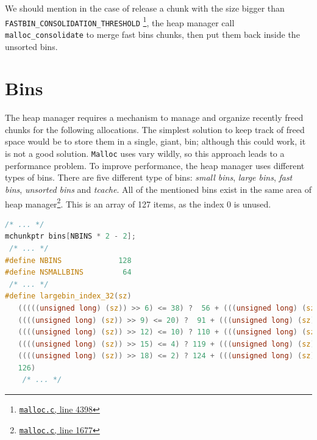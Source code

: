 \documentclass{masterthesis}
\newcommand*\tch{tcache}
\newcommand*\fb{fast bins}
\newcommand*\ub{unsorted bins}
\newcommand*\lb{large bins}
\newcommand*\sbs{small bins}
\newcommand*\Mallocc{\lstinline{Malloc}\xspace}
\begin{document}
We should mention in the case of release a chunk with the size bigger than \linebreak \lstinline{FASTBIN_CONSOLIDATION_THRESHOLD} \footnote{\href{https://sourceware.org/git/?p=glibc.git;a=blob;f=malloc/malloc.c;h=f7cd29bc2f93e1082ee77800bd64a4b2a2897055;hb=9ea3686266dca3f004ba874745a4087a89682617\#l4398}{\texttt{malloc.c}, line 4398}}, the heap manager call \lstinline{malloc_consolidate} to merge \fb{} chunks, then put them back inside the \ub{}.

\section{Bins}
The heap manager requires a mechanism to manage and organize recently freed chunks for the following allocations. The simplest solution to keep track of freed space would be to store them in a single, giant, bin; although this could work, it is not a good solution. \Mallocc{} uses vary wildly, so this approach leads to a performance problem.
To improve performance, the heap manager uses different types of bins. There are five different type of bins: \emph{\sbs{}}, \emph{\lb{}}, \emph{\fb{}}, \emph{\ub{}} and \emph{\tch{}}. All of the mentioned bins exist in the same area of heap manager\footnote{\href{https://sourceware.org/git/?p=glibc.git;a=blob;f=malloc/malloc.c;h=f7cd29bc2f93e1082ee77800bd64a4b2a2897055;hb=9ea3686266dca3f004ba874745a4087a89682617\#l1677}{\texttt{malloc.c}, line 1677}}. This is an array of 127 items, as the index 0 is unused.
\begin{lstlisting}[language=c,frame=tlrb]
 /* ... */
mchunkptr bins[NBINS * 2 - 2];
 /* ... */
#define NBINS             128
#define NSMALLBINS         64
 /* ... */
#define largebin_index_32(sz)                                                \
   (((((unsigned long) (sz)) >> 6) <= 38) ?  56 + (((unsigned long) (sz)) >> 6) :\
   ((((unsigned long) (sz)) >> 9) <= 20) ?  91 + (((unsigned long) (sz)) >> 9) :\
   ((((unsigned long) (sz)) >> 12) <= 10) ? 110 + (((unsigned long) (sz)) >> 12) :\
   ((((unsigned long) (sz)) >> 15) <= 4) ? 119 + (((unsigned long) (sz)) >> 15) :\
   ((((unsigned long) (sz)) >> 18) <= 2) ? 124 + (((unsigned long) (sz)) >> 18) :\
   126)
    /* ... */
\end{lstlisting}
\end{document}

